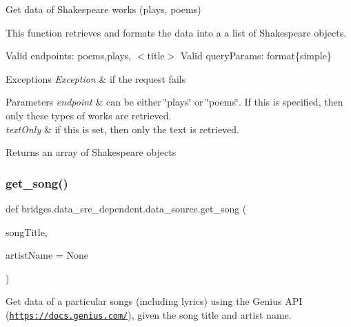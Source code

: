 Get data of Shakespeare works (plays, poems) 

This function retrieves and formats the data into a a list of Shakespeare objects.

Valid endpoints\+: \textquotesingle{}poems\textquotesingle{},\textquotesingle{}plays\textquotesingle{}, $<$title$>$ Valid query\+Params\+: format\{simple\}


\begin{DoxyExceptions}{Exceptions}
{\em Exception} & if the request fails\\
\hline
\end{DoxyExceptions}

\begin{DoxyParams}{Parameters}
{\em endpoint} & can be either \char`\"{}plays\char`\"{} or \char`\"{}poems\char`\"{}. If this is specified, then only these types of works are retrieved. \\
\hline
{\em text\+Only} & if this is set, then only the text is retrieved.\\
\hline
\end{DoxyParams}
\begin{DoxyReturn}{Returns}
an array of Shakespeare objects 
\end{DoxyReturn}
\mbox{\label{namespacebridges_1_1data__src__dependent_1_1data__source_a060ab8ec1777a5458a37d5e01e594e82}} 
\subsubsection{\texorpdfstring{get\+\_\+song()}{get\_song()}}
{\footnotesize\ttfamily def bridges.\+data\+\_\+src\+\_\+dependent.\+data\+\_\+source.\+get\+\_\+song (\begin{DoxyParamCaption}\item[{}]{song\+Title,  }\item[{}]{artist\+Name = {\ttfamily None} }\end{DoxyParamCaption})}



Get data of a particular songs (including lyrics) using the Genius A\+PI (\href{https://docs.genius.com/}{\tt https\+://docs.\+genius.\+com/}), given the song title and artist name. 

